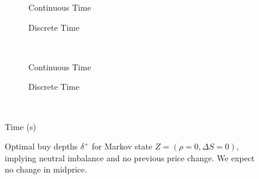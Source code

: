 \begin{figure}
\centering
\begin{subfigure}{.45\linewidth}
  \centering
  \setlength\figureheight{\linewidth} 
  \setlength\figurewidth{\linewidth}
  
  \caption{Continuous Time}
\end{subfigure}%
\hfill%
\begin{subfigure}{.45\linewidth}
  \centering
  \setlength\figureheight{\linewidth} 
  \setlength\figurewidth{\linewidth}
   
  \caption{Discrete Time}
\end{subfigure}\\
\vspace{1cm}
\begin{subfigure}{.45\linewidth}
  \centering
  \setlength\figureheight{\linewidth} 
  \setlength\figurewidth{\linewidth}
  
  \caption{Continuous Time}
\end{subfigure}%
\hfill%
\begin{subfigure}{.45\linewidth}
  \centering
  \setlength\figureheight{\linewidth} 
  \setlength\figurewidth{\linewidth}
   
  \caption{Discrete Time}
\end{subfigure}\\

\leavevmode{}\hspace{0pt plus 1filll}\null

Time (s)

\vspace{1cm}
\begin{subfigure}{\linewidth}
  \centering
   
\end{subfigure}%
  \caption{Optimal buy depths $\delta^+$ for Markov state $Z=(\rho = 0, \Delta S = 0)$, implying neutral imbalance and no previous price change. We expect no change in midprice.}
  \label{fig:comp_dp_z8}
\end{figure}


